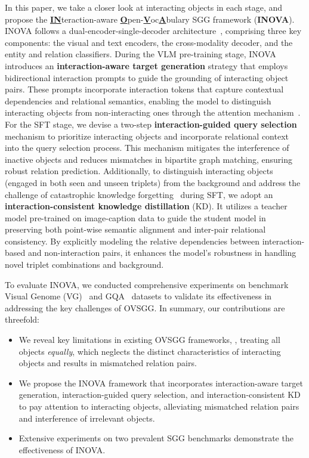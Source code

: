 In this paper, we take a closer look at interacting objects in each stage, and propose the \underline{\textbf{IN}}teraction-aware \underline{\textbf{O}}pen-\underline{\textbf{V}}oc\underline{\textbf{A}}bulary SGG framework (\textbf{INOVA}).  INOVA follows a dual-encoder-single-decoder architecture~\cite{liu2023grounding}, comprising three key components: the visual and text encoders, the cross-modality decoder, and the entity and relation classifiers. During the VLM pre-training stage, INOVA introduces an \textbf{interaction-aware target generation} strategy that employs bidirectional interaction prompts to guide the grounding of interacting object pairs. These prompts incorporate interaction tokens that capture contextual dependencies and relational semantics, enabling the model to distinguish interacting objects from non-interacting ones through the attention mechanism~\cite{vaswani2017attention}. For the SFT stage, we devise a two-step \textbf{interaction-guided query selection} mechanism to prioritize interacting objects and incorporate relational context into the query selection process. This mechanism mitigates the interference of inactive objects and reduces mismatches in bipartite graph matching, ensuring robust relation prediction. Additionally, to distinguish interacting objects (engaged in both seen and unseen triplets) from the background and address the challenge of catastrophic knowledge forgetting~\cite{chen2024expanding} during SFT, we adopt an \textbf{interaction-consistent knowledge distillation} (KD). It utilizes a teacher model pre-trained on image-caption data to guide the student model in preserving both point-wise semantic alignment and inter-pair relational consistency. By explicitly modeling the relative dependencies between interaction-based and non-interaction pairs, it enhances the model's robustness in handling novel triplet combinations and background. 

To evaluate INOVA, we conducted comprehensive experiments on benchmark Visual Genome (VG)~\citep{krishna2017visual} and GQA~\citep{hudson2019gqa} datasets to validate its effectiveness in addressing the key challenges of OVSGG. In summary, our contributions are threefold:
\begin{itemize}[itemsep=0pt, parsep=0pt, topsep=0pt, partopsep=0pt]
\item We reveal key limitations in existing OVSGG frameworks, \ie, treating all objects \textit{equally}, which neglects the distinct characteristics of interacting objects and results in mismatched relation pairs.
\item We propose the INOVA framework that incorporates interaction-aware target generation, interaction-guided query selection, and interaction-consistent KD to pay attention to interacting objects, alleviating mismatched relation pairs and interference of irrelevant objects.
\item Extensive experiments on two prevalent SGG benchmarks demonstrate the effectiveness of INOVA.
\end{itemize}




